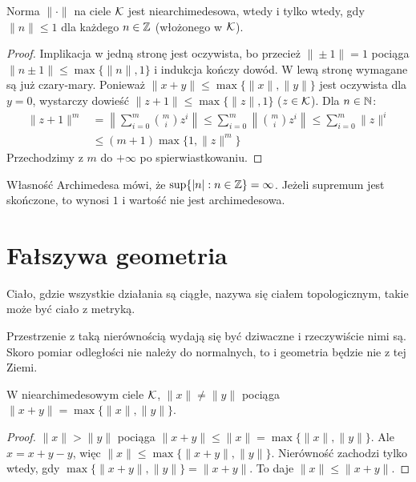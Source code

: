 \begin{fakt}
	Norma $\|\cdot\|$ na ciele $\mathcal K$ jest niearchimedesowa, wtedy i tylko wtedy, gdy $\|n\| \le 1$ dla każdego $n \in \mathbb Z$ (włożonego w $\mathcal K$).
\end{fakt}

\begin{proof}
	Implikacja w jedną stronę jest oczywista, bo przecież $\|\pm 1\| = 1$ pociąga $\|n \pm 1\| \le \max \{\|n\|, 1\}$ i indukcja kończy dowód.
	W lewą stronę wymagane są już czary-mary.
	Ponieważ $\|x + y\| \le \max \{\|x\|, \|y\|\}$ jest oczywista dla $y = 0$, wystarczy dowieść $\|z+1\| \le \max \{\|z\|, 1\}$ ($z \in \mathcal K$).
	Dla $n \in \mathbb N$:
	\begin{align*}
		\|z+1\|^m & = \left\|\sum_{i=0}^m {m \choose i} z^i \right\| \le \sum_{i=0}^m \left\|{m \choose i} z^i \right\| \le \sum_{i=0}^m \|z\|^i \\
		& \le (m+1) \max \{1, \|z\|^m\}
	\end{align*}
	Przechodzimy z $m$ do $+ \infty$ po spierwiastkowaniu.
\end{proof}

Własność Archimedesa mówi, że $\sup\{|n| : n \in \mathbb Z\} = \infty$.
Jeżeli supremum jest skończone, to wynosi $1$ i wartość nie jest archimedesowa.

\begin{historia}\end{historia}

\section{Fałszywa geometria}
Ciało, gdzie wszystkie działania są ciągłe, nazywa się ciałem topologicznym, takie może być ciało z metryką.

Przestrzenie z taką nierównością wydają się być dziwaczne i rzeczywiście nimi są.
Skoro pomiar odległości nie należy do normalnych, to i geometria będzie nie z tej Ziemi.

\begin{fakt}
	W niearchimedesowym ciele $\mathcal K$, $\|x\| \neq \|y\|$ pociąga $\|x+y\| = \max \{\|x\|, \|y\|\}$.
\end{fakt}

\begin{proof}
	$\|x\| > \|y\|$ pociąga $\|x+y\| \le \|x\| = \max\{\|x\|,\|y\|\}$.
	Ale $x = x+y-y$, więc $\|x\| \le \max \{\|x+y\|, \|y\|\}$.
	Nierówność zachodzi tylko wtedy, gdy $\max\{\|x+y\|, \|y\|\} = \|x+y\|$.
	To daje $\|x\| \le \|x+y\|$.
\end{proof}

